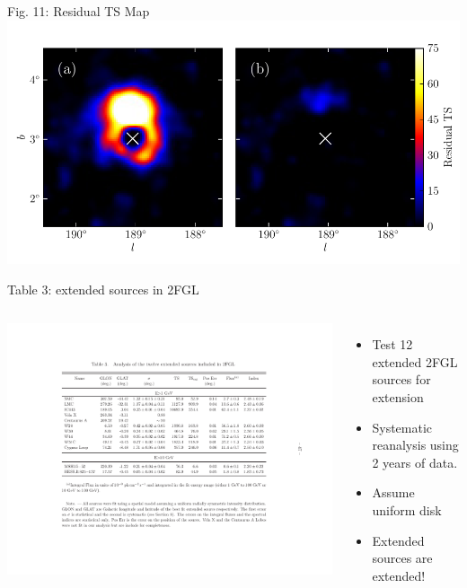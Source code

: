 \documentclass[12pt]{beamer}
\begin{document}
\begin{frame}{Fig. 11: Residual TS Map}
  \includegraphics[scale=0.5]{plots/res_tsmap_ic443_color.pdf}
\end{frame}


\begin{frame}{Table 3: extended sources in 2FGL}
  \begin{columns}
    \includegraphics[scale=0.4]{plots/table_reanalysis.pdf}
    \begin{itemize}
      \item Test 12 extended 2FGL sources for extension
      \item Systematic reanalysis using 2 years of data.
      \item Assume uniform disk
      \item Extended sources are extended!
    \end{itemize}
  \end{columns}
\end{frame}
\end{document}
